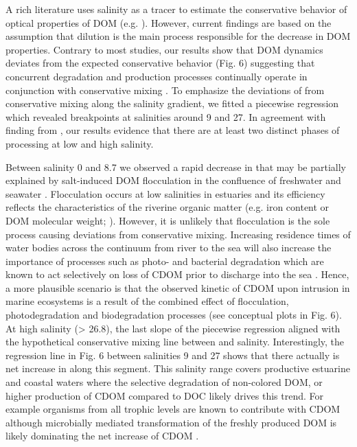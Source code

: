 A rich literature uses salinity as a tracer to estimate the conservative behavior of optical properties of DOM (e.g. \cite{Kowalczuk2010, Asmala2016}). However, current findings are based on the assumption that dilution is the main process responsible for the decrease in DOM properties. Contrary to most studies, our results show that DOM dynamics deviates from the expected conservative behavior (Fig. 6) suggesting that concurrent degradation and production processes continually operate in conjunction with conservative mixing \citep{Markager2011, Goncalves2015}. To emphasize the deviations of  from conservative mixing along the salinity gradient, we fitted a piecewise regression which revealed breakpoints at salinities around 9 and 27. In agreement with finding from \citet{Goncalves2015}, our results evidence that there are at least two distinct phases of processing at low and high salinity.

Between salinity 0 and 8.7 we observed a rapid decrease in  that may be partially explained by salt-induced DOM flocculation in the confluence of freshwater and seawater \citep{Sholkovitz1976, Sondergaard2003}. Flocculation occurs at low salinities in estuaries and its efficiency reflects the characteristics of the riverine organic matter (e.g. iron content or DOM molecular weight; \cite{Mayer1982, Forsgren1996, Asmala2014a}). However, it is unlikely that flocculation is the sole process causing deviations from conservative mixing. Increasing residence times of water bodies across the continuum from river to the sea will also increase the importance of processes such as photo- and bacterial degradation which are known to act selectively on loss of CDOM prior to discharge into the sea \citep{Weyhenmeyer2012}. Hence, a more plausible scenario is that the observed kinetic of CDOM upon intrusion in marine ecosystems is a result of the combined effect of flocculation, photodegradation and biodegradation processes (see conceptual plots in Fig. 6). At high salinity (> 26.8), the last slope of the piecewise regression aligned with the hypothetical conservative mixing line between  and salinity. Interestingly, the regression line in Fig. 6 between salinities 9 and 27 shows that there actually is net increase in  along this segment. This salinity range covers productive estuarine and coastal waters where the selective degradation of non-colored DOM, or higher production of CDOM compared to DOC likely drives this trend. For example organisms from all trophic levels are known to contribute with CDOM \citep{Steinberg2004, Stedmon2014} although microbially mediated transformation of the freshly produced DOM is likely dominating the net increase of CDOM \citep{Rochelle-Newall2002, Yamashita2004}.

